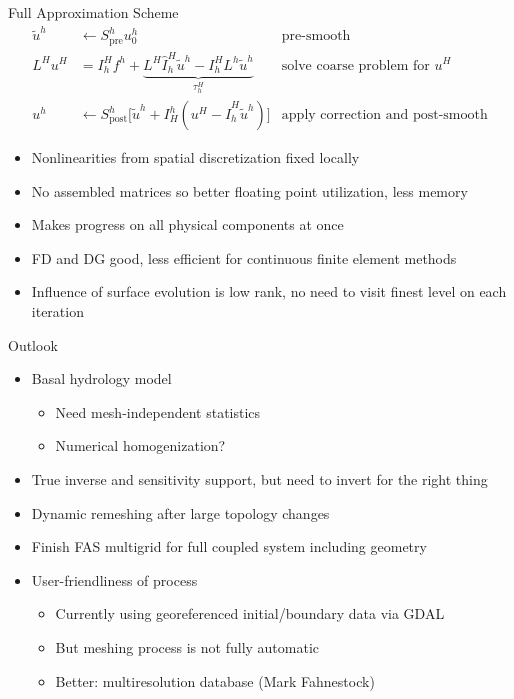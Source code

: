 \documentclass{beamer}
\begin{document}
\begin{frame}{Full Approximation Scheme}
  \begin{align*}
    \tilde u^h &\gets S^h_{\text{pre}} u^h_0 & \text{pre-smooth} \\
    L^H u^H &= I_h^H f^h + \underbrace{L^H \hat I_h^H \tilde u^h - I_h^H L^h \tilde u^h}_{\tau_h^H} & \text{solve coarse problem for $u^H$} \\
    u^h & \gets S^h_{\text{post}} \Big[ \tilde u^h + I_H^h (u^H - \hat I_h^H \tilde u^h) \Big] & \text{apply correction and post-smooth}
  \end{align*}
  \begin{itemize}
  \item Nonlinearities from spatial discretization fixed locally
  \item No assembled matrices so better floating point utilization, less memory
  \item Makes progress on all physical components at once
  \item FD and DG good, less efficient for continuous finite element methods
  \item Influence of surface evolution is low rank, no need to visit finest level on each iteration
  \end{itemize}
\end{frame}

\begin{frame}{Outlook}
  \begin{itemize}
  \item Basal hydrology model
    \begin{itemize}
    \item Need mesh-independent statistics
    \item Numerical homogenization?
    \end{itemize}
  \item True inverse and sensitivity support, but need to invert for the right thing
  \item Dynamic remeshing after large topology changes
  \item Finish FAS multigrid for full coupled system including geometry
  \item User-friendliness of process
    \begin{itemize}
    \item Currently using georeferenced initial/boundary data via GDAL
    \item But meshing process is not fully automatic
    \item Better: multiresolution database (Mark Fahnestock)
    \end{itemize}
  \end{itemize}
\end{frame}
\end{document}
